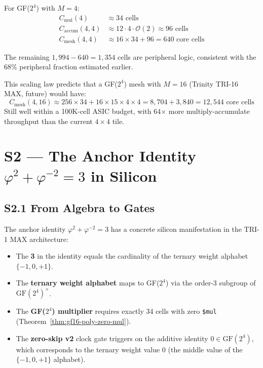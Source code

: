 For GF(\(2^4\)) with \(M = 4\):
\begin{align}
C_{\mathrm{mul}}(4) &\approx 34 \text{ cells} \\
C_{\mathrm{accum}}(4, 4) &\approx 12 \cdot 4 \cdot \mathcal{O}(2) \approx 96 \text{ cells} \\
C_{\mathrm{mesh}}(4, 4) &\approx 16 \times 34 + 96 = 640 \text{ core cells}
\end{align}

The remaining \(1{,}994 - 640 = 1{,}354\) cells are peripheral logic,
consistent with the 68\% peripheral fraction estimated earlier.

This scaling law predicts that a GF(\(2^4\)) mesh with \(M = 16\)
(Trinity TRI-16 MAX, future) would have:
\[
C_{\mathrm{mesh}}(4, 16) \approx 256 \times 34 + 16 \times 15 \times 4 \times 4 = 8{,}704 + 3{,}840 = 12{,}544 \text{ core cells}
\]
Still well within a 100K-cell ASIC budget, with 64\(\times\) more multiply-accumulate
throughput than the current \(4 \times 4\) tile.


\section{S2 --- The Anchor Identity \texorpdfstring{\(\varphi^{2}+\varphi^{-2}=3\)}{phi2+phi-2=3} in Silicon}
\label{sec:glava35-s2-anchor}

\subsection{S2.1 From Algebra to Gates}

The anchor identity \(\varphi^{2}+\varphi^{-2}=3\) has a concrete
silicon manifestation in the TRI-1 MAX architecture:

\begin{itemize}
  \item The \textbf{3} in the identity equals the cardinality of the
        ternary weight alphabet \(\{-1, 0, +1\}\).
  \item The \textbf{ternary weight alphabet} maps to GF(\(2^4\)) via
        the order-3 subgroup of \(\mathrm{GF}(2^4)^\times\).
  \item The \textbf{GF(\(2^4\)) multiplier} requires exactly 34 cells
        with zero \texttt{\$mul} (Theorem~\ref{thm:gf16-poly-zero-mul}).
  \item The \textbf{zero-skip v2} clock gate triggers on the additive
        identity \(0 \in \mathrm{GF}(2^4)\), which corresponds to
        the ternary weight value 0 (the middle value of the
        \(\{-1, 0, +1\}\) alphabet).
\end{itemize}


